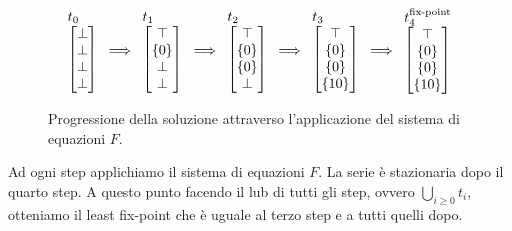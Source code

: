 \begin{example}
\begin{figure}[H]
    \centering
\[
\arraycolsep=1.1pt
\begin{array}{ccccccccc}
    \begin{tabular}{l}
    $
    t_0
    $ \\
    $
    \begin{bmatrix}
       \perp \\
       \perp \\
       \perp \\
       \perp
    \end{bmatrix}
    $
    \end{tabular}
    &
    \Longrightarrow
    &
    \begin{tabular}{l}
    $t_1$ \\
    $
    \begin{bmatrix}
       \top \\
       \{0\} \\
       \perp \\
       \perp
    \end{bmatrix}
    $
    \end{tabular}
    &
    \Longrightarrow
    &
    \begin{tabular}{l}
    $t_2$ \\
    $
    \begin{bmatrix}
       \top \\
       \{0\} \\
       \{0\} \\
       \perp
    \end{bmatrix}
    $
    \end{tabular}
    &
    \Longrightarrow
    &
    \begin{tabular}{l}
    $t_3$ \\
    $
    \begin{bmatrix}
       \top \\
       \{0\} \\
       \{0\} \\
       \{10\}
    \end{bmatrix}
    $
    \end{tabular}
    &
    \Longrightarrow
    &
    \begin{tabular}{l}
    $t_4^{\textrm{fix-point}}$ \\
    $
    \begin{bmatrix}
       \top \\
       \{0\} \\
       \{0\} \\
       \{10\}
    \end{bmatrix}
    $
    \end{tabular}
\end{array}
\]
    \caption{Progressione della soluzione attraverso l'applicazione del sistema di equazioni \(F\).}
    \label{fig:progression}
\end{figure}

Ad ogni step applichiamo il sistema di equazioni \(F\). La serie è stazionaria dopo il quarto step. A questo punto facendo il lub di tutti gli step, ovvero \(\bigcup_{i\geq 0} t_i\), otteniamo il least fix-point che è uguale al terzo step e a tutti quelli dopo.
\end{example}

